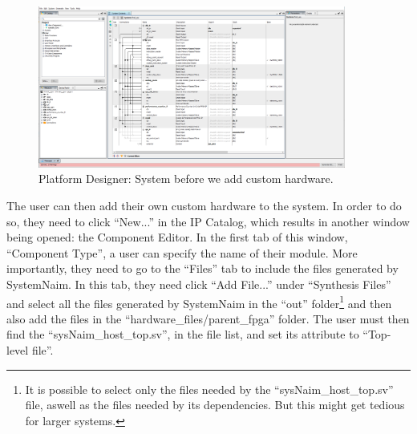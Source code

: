 \begin{figure}[!h]
    \centering
    \includegraphics[width=0.9\textwidth]{05_evaluation/images/pd_no_module.png}
    \caption{Platform Designer: System before we add custom hardware.}
    \label{fig:pd_start}
\end{figure}

The user can then add their own custom hardware to the system. In order to do so, they need to click “New...” in the IP Catalog, which results in another window being opened: the Component Editor. In the first tab of this window, “Component Type”, a user can specify the name of their module. More importantly, they need to go to the “Files” tab to include the files generated by SystemNaim. In this tab, they need click “Add File...” under “Synthesis Files” and select all the files generated by SystemNaim in the “out” folder\footnote{It is possible to select only the files needed by the “sysNaim\_host\_top.sv” file, aswell as the files needed by its dependencies. But this might get tedious for larger systems.} and then also add the files in the “hardware\_files/parent\_fpga” folder. The user must then find the “sysNaim\_host\_top.sv”, in the file list, and set its attribute to “Top-level file”. 

